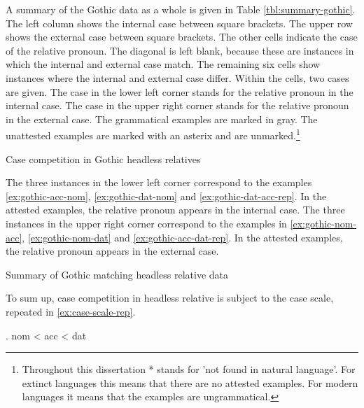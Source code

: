 A summary of the Gothic data as a whole is given in Table \ref{tbl:summary-gothic}. The left column shows the internal case between square brackets. The upper row shows the external case between square brackets. The other cells indicate the case of the relative pronoun. The diagonal is left blank, because these are instances in which the internal and external case match.
The remaining six cells show instances where the internal and external case differ. Within the cells, two cases are given. The case in the lower left corner stands for the relative pronoun in the internal case. The case in the upper right corner stands for the relative pronoun in the external case. The grammatical examples are marked in gray. The unattested examples are marked with an asterix and are unmarked.\footnote{
Throughout this dissertation * stands for 'not found in natural language'. For extinct languages this means that there are no attested examples. For modern languages it means that the examples are ungrammatical.
}

\begin{table}[ht]
  \center
  \caption {Case competition in Gothic headless relatives}
    
    \label{tbl:summary-gothic}
\end{table}

The three instances in the lower left corner correspond to the examples \ref{ex:gothic-acc-nom}, \ref{ex:gothic-dat-nom} and \ref{ex:gothic-dat-acc-rep}. In the attested examples, the relative pronoun appears in the internal case.
The three instances in the upper right corner correspond to the examples in \ref{ex:gothic-nom-acc}, \ref{ex:gothic-nom-dat} and \ref{ex:gothic-acc-dat-rep}. In the attested examples, the relative pronoun appears in the external case.

\begin{table}[ht]
  \center
  \caption {Summary of Gothic matching headless relative data}
    
    \label{tbl:summary-gothic-1}
\end{table}

To sum up, case competition in headless relative is subject to the case scale, repeated in \ref{ex:case-scale-rep}.

\ex. \ac{nom} < \ac{acc} < \ac{dat}\label{ex:case-scale-rep}

